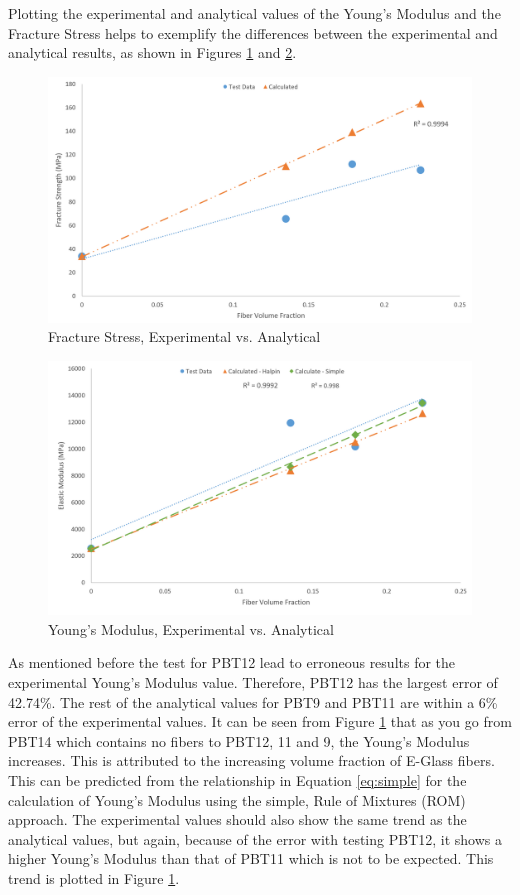 \documentclass[11pt]{article}
\begin{document}
Plotting the experimental and analytical values of the Young's Modulus and the Fracture Stress helps to exemplify the differences between the experimental and analytical results, as shown in Figures \ref{FScompare} and \ref{ModulusCompare}.

\begin{figure}[H]
\centering
\includegraphics[width=.95\linewidth]{figures/fracture_stress_test_vs_calc.png}
\caption{Fracture Stress, Experimental vs. Analytical}
\label{FScompare}
\end{figure}

\begin{figure}[H]
\centering
\includegraphics[width=.95\linewidth]{figures/modulus_test_vs_calc.png}
\caption{Young's Modulus, Experimental vs. Analytical}
\label{ModulusCompare}
\end{figure}

As mentioned before the test for PBT12 lead to erroneous results for the experimental Young's Modulus value. Therefore, PBT12 has the largest error of 42.74\%. The rest of the analytical values for PBT9 and PBT11 are within a 6\% error of the experimental values. It can be seen from Figure \ref{FScompare} that as you go from PBT14 which contains no fibers to PBT12, 11 and  9, the Young's Modulus increases. This is attributed to the increasing volume fraction of E-Glass fibers. This can be predicted from the relationship in Equation \ref{eq:simple} for the calculation of Young's Modulus using the simple, Rule of Mixtures (ROM) approach. The experimental values should also show the same trend as the analytical values, but again, because of the error with testing PBT12, it shows a higher Young's Modulus than that of PBT11 which is not to be expected. This trend is plotted in Figure \ref{FScompare}.
\singlespacing
\end{document}
